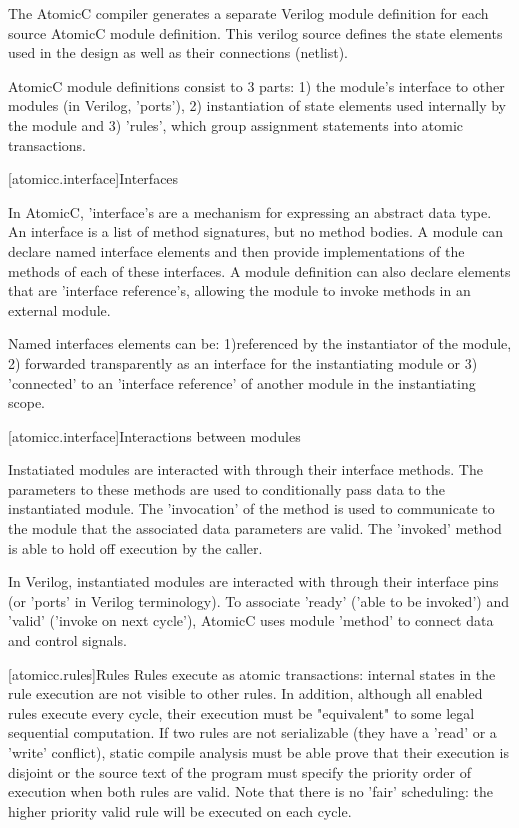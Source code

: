 The AtomicC compiler generates a separate Verilog module definition
for each source AtomicC module definition.
This verilog source defines the state elements
used in the design as well as their connections (netlist).

AtomicC module definitions consist to 3 parts: 1) the module's interface to other
modules (in Verilog, 'ports'), 2) instantiation
of state elements used internally by the module and 3) 'rules', which group
assignment statements into atomic transactions.

[atomicc.interface]{Interfaces}

In AtomicC, 'interface's are a mechanism for expressing an abstract data type\cite{Liskov74programmingwith}.
An interface
is a list of method signatures, but no method bodies.
A module can declare named interface elements and then provide implementations of
the methods of each of these interfaces.  A module definition can also declare
elements that are 'interface reference's, allowing the module to invoke methods
in an external module.

Named interfaces elements can be: 1)referenced by the instantiator of the module,
2) forwarded transparently as an interface for the instantiating module or 3) 'connected'
to an 'interface reference' of another module in the instantiating scope.

\cite{MitchPlt}

[atomicc.interface]{Interactions between modules}

Instatiated modules are interacted with through their interface methods.  The parameters
to these methods are used to conditionally pass data to the instantiated module.
The 'invocation' of the method is used to communicate to the module that the associated
data parameters are valid.  The 'invoked' method is able to hold off execution by the
caller.

In Verilog, instantiated modules are interacted with through their interface pins
(or 'ports' in Verilog terminology).  To associate 'ready' ('able to be invoked')
and 'valid' ('invoke on next cycle'), AtomicC uses module 'method' to connect data
and control signals.

[atomicc.rules]{Rules}
Rules execute as atomic transactions: internal states in the rule
execution are not visible to other rules.  In addition, although all enabled
rules execute every cycle, their execution must be 
"equivalent" to some legal sequential computation.
\cite{Lamport:1979:MMC:1311099.1311750}
If two rules are not serializable (they have a 'read' or a 'write' conflict),
static compile analysis must be able prove that their execution is disjoint
or the source text of the program must specify the priority order of execution
when both rules are valid.
Note that there is no 'fair' scheduling: the higher priority valid rule will
be executed on each cycle.

